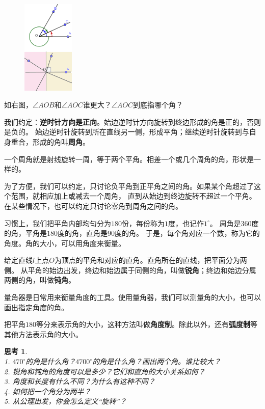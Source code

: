 \documentclass[12pt,UTF8]{ctexbook}
\newtheorem{sk}{思考}[section]
\begin{document}
\begin{figure} %
    \vspace{-10pt}
    \includegraphics[width=0.22\textwidth]{角度1.png}
\end{figure}

如右图，$\angle AOB$和$\angle AOC$谁更大？$\angle AOC$到底指哪个角？

我们约定：\textbf{逆时针方向是正向}。始边逆时针方向旋转到终边形成的角是正的，否则是负的。
始边逆时针旋转到所在直线另一侧，形成平角；继续逆时针旋转到与自身重合，形成的角叫\textbf{周角}。

一个周角就是射线旋转一周，等于两个平角。相差一个或几个周角的角，形状是一样的。

为了方便，我们可以约定，只讨论负平角到正平角之间的角。如果某个角超过了这个范围，就相应加上或减去一个周角，
直到从始边到终边旋转不超过一个平角。在某些情况下，也可以约定只讨论零角到周角之间的角。

习惯上，我们把平角内部均匀分为$180$份，每份称为$1$度，也记作$1^\circ$。
周角是$360$度的角，平角是$180$度的角，直角是$90$度的角。
于是，每个角对应一个数，称为它的角度。角的大小，可以用角度来衡量。

给定直线$l$上点$O$为顶点的平角和对应的直角。直角所在的直线，把平面分为两侧。
从平角的始边出发，终边和始边属于同侧的角，叫做\textbf{锐角}；终边和始边分属两侧的角，叫做\textbf{钝角}。

量角器是日常用来衡量角度的工具。使用量角器，我们可以测量角的大小，也可以画出指定角度的角。

把平角$180$等分来表示角的大小，这种方法叫做\textbf{角度制}。除此以外，还有\textbf{弧度制}等其他方法表示角的大小。
\begin{sk}\label{sk:0-2-0}
    \mbox{}\\
    1. $470^\circ$的角是什么角？$4700^\circ$的角是什么角？画出两个角。谁比较大？\\
    2. 锐角和钝角的角度可以是多少？它们和直角的大小关系如何？\\
    3. 角度和长度有什么不同？为什么有这种不同？\\
    4. 如何把一个角分为两半？\\
    5. 从公理出发，你会怎么定义“旋转”？
\end{sk}
\end{document}
